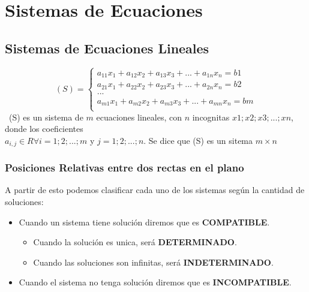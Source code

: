 \documentclass[10pt]{article}
\begin{document}
\section{Sistemas de Ecuaciones}
\subsection{Sistemas de Ecuaciones Lineales}
\[(S) = \left\{ \begin{array}{ll}
a_{11} x_1 + a_{12} x_2 + a_{13} x_3 + ... + a_{1n} x_n = b1\\
a_{21} x_1 + a_{22} x_2 + a_{23} x_3 + ... + a_{2n} x_n = b2\\
...\\
a_{m1} x_1 + a_{m2} x_2 + a_{m3} x_3 + ... + a_{mn} x_n = bm\\
\end{array}\right.\]\
(S) es un sistema de $m$ ecuaciones lineales, con $n$ incognitas $x1;x2;x3;...;xn$, donde los coeficientes\\ $a_{i,j} \in R \forall i=1;2;...;m$ y $j=1;2;...;n$. Se dice que (S) es un sitema $m \times n$
\subsubsection{Posiciones Relativas entre dos rectas en el plano}
\begin{center}
\end{center}
\vspace{.5cm}
A partir de esto podemos clasificar cada uno de los sistemas según la cantidad de soluciones:
\begin{itemize}
\item Cuando un sistema tiene solución diremos que es \textbf{COMPATIBLE}.
\begin{itemize}
\item Cuando la solución es unica, será \textbf{DETERMINADO}.
\item Cuando las soluciones son infinitas, será \textbf{INDETERMINADO}.
\end{itemize}
\item Cuando el sistema no tenga solución diremos que es \textbf{INCOMPATIBLE}.
\end{itemize}
\end{document}

